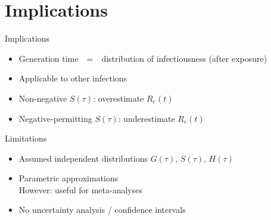 \documentclass[aspectratio=169,professionalfonts]{beamer}
\begin{document}
\section{Implications}
\begin{frame}{Implications}
  \pause
  \begin{itemize}
    \item Generation time\ \ =\ \ distribution of infectiousness (after exposure)
  \end{itemize}
  \pause
  \begin{itemize}
    \item Applicable to other infections
  \end{itemize}
  \pause
  \begin{itemize}
    \item Non-negative $S(\tau)$: overestimate $R_e(t)$
    \item Negative-permitting $S(\tau)$: underestimate $R_e(t)$
  \end{itemize}
\end{frame}
\begin{frame}{Limitations}
  \begin{itemize}
    \pause
    \item Assumed independent distributions $G(\tau)$, $S(\tau)$, $H(\tau)$
    \pause
    \item Parametric approximations\\
          However: useful for meta-analyses
    \pause
    \item No uncertainty analysis / confidence intervals
  \end{itemize}
\end{frame}
\end{document}
